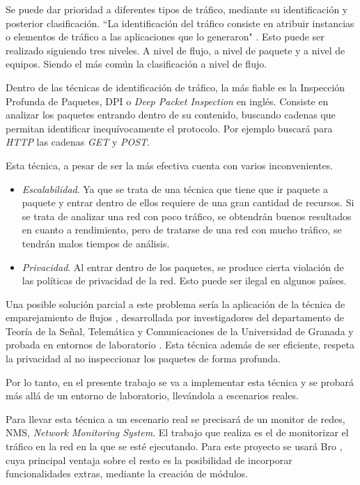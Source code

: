 \intro Se puede dar prioridad a diferentes tipos de tráfico, mediante su identificación y posterior clasificación. ``La identificación 
del tráfico consiste en atribuir instancias o elementos de tráfico a las aplicaciones que lo generaron" \cite{khalife2016}. Esto puede 
ser realizado siguiendo tres niveles. A nivel de flujo, a nivel de paquete y a nivel de equipos. Siendo el más común la clasificación 
a nivel de flujo.

\intro Dentro de las técnicas de identificación de tráfico, la más fiable es la Inspección Profunda de Paquetes, DPI o \textit{Deep 
Packet Inspection} en inglés\cite{dpiaproximacion}. Consiste en analizar los paquetes entrando dentro de su contenido, buscando 
cadenas que permitan identificar inequívocamente el protocolo. Por ejemplo buscará para \textit{HTTP} las cadenas \textit{GET} y 
\textit{POST}.

\intro Esta técnica, a pesar de ser la más efectiva cuenta con varios inconvenientes.
\begin{itemize}
\item \textit{Escalabilidad}. Ya que se trata de una técnica que tiene que ir paquete a paquete y entrar dentro de ellos requiere de 
una gran cantidad de recursos. Si se trata de analizar una red con poco tráfico, se obtendrán buenos resultados en cuanto a 
rendimiento, pero de tratarse de una red con mucho tráfico, se tendrán malos tiempos de análisis.
\item \textit{Privacidad}. Al entrar dentro de los paquetes, se produce cierta violación de las políticas de privacidad de la red. Esto puede ser ilegal en algunos países.
\end{itemize}

\intro Una posible solución parcial a este problema sería la aplicación de la técnica de emparejamiento de flujos \cite{presentacion}, 
desarrollada por investigadores del departamento de Teoría de la Señal, Telemática y Comunicaciones de la Universidad de Granada y  
probada en entornos de laboratorio \cite{comparacion}. Esta técnica además de ser eficiente, respeta la privacidad al no inspeccionar 
los paquetes de forma profunda.

\intro Por lo tanto, en el presente trabajo se va a implementar esta técnica y se probará más allá de un entorno de laboratorio, 
llevándola a escenarios reales.

\intro Para llevar esta técnica a un escenario real se precisará de un monitor de redes, NMS, \textit{Network Monitoring System}. 
El trabajo que realiza es el de monitorizar el tráfico en la red en la que se esté ejecutando.
Para este proyecto se usará Bro \cite{broindex}, cuya principal ventaja sobre el resto es la posibilidad de incorporar funcionalidades 
extras, mediante la creación de módulos.

